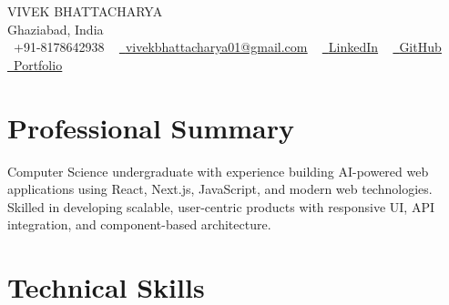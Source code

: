 \documentclass[letterpaper,10pt]{article}
\begin{document}

\begin{center}
    {\Huge \scshape VIVEK BHATTACHARYA} \\ \vspace{1pt}
    Ghaziabad, India \\ \vspace{1pt}
    \scriptsize
    \raisebox{-0.1\height}\faPhone\ +91-8178642938 ~
    \href{mailto:vivekbhattacharya01@gmail.com}{\raisebox{-0.2\height}\faEnvelope\ \underline{vivekbhattacharya01@gmail.com}} ~
    \href{https://www.linkedin.com/in/vivek-bhattacharya-9a661528a/}{\raisebox{-0.2\height}\faLinkedin\ \underline{LinkedIn}} ~
    \href{https://github.com/vivekbhattacharya01-gif}{\raisebox{-0.2\height}\faGithub\ \underline{GitHub}} ~
    \href{https://anime-portfolio-mu.vercel.app/}{\raisebox{-0.2\height}\faGlobe\ \underline{Portfolio}}
\end{center}


\section{Professional Summary}

\begin{itemize}[leftmargin=0.15in]
\small{
\item Computer Science undergraduate with experience building AI-powered web applications using React, Next.js, JavaScript, and modern web technologies. Skilled in developing scalable, user-centric products with responsive UI, API integration, and component-based architecture.
}
\end{itemize}

\vspace{-16pt}


\section{Technical Skills}
\end{document}
